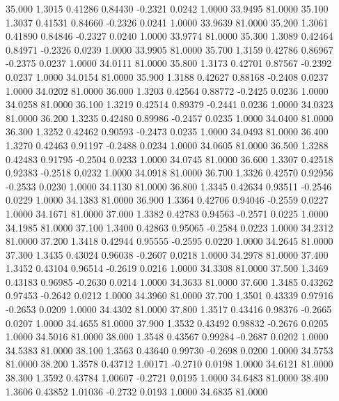   35.000   1.3015   0.41286   0.84430  -0.2321   0.0242   1.0000  33.9495  81.0000
  35.100   1.3037   0.41531   0.84660  -0.2326   0.0241   1.0000  33.9639  81.0000
  35.200   1.3061   0.41890   0.84846  -0.2327   0.0240   1.0000  33.9774  81.0000
  35.300   1.3089   0.42464   0.84971  -0.2326   0.0239   1.0000  33.9905  81.0000
  35.700   1.3159   0.42786   0.86967  -0.2375   0.0237   1.0000  34.0111  81.0000
  35.800   1.3173   0.42701   0.87567  -0.2392   0.0237   1.0000  34.0154  81.0000
  35.900   1.3188   0.42627   0.88168  -0.2408   0.0237   1.0000  34.0202  81.0000
  36.000   1.3203   0.42564   0.88772  -0.2425   0.0236   1.0000  34.0258  81.0000
  36.100   1.3219   0.42514   0.89379  -0.2441   0.0236   1.0000  34.0323  81.0000
  36.200   1.3235   0.42480   0.89986  -0.2457   0.0235   1.0000  34.0400  81.0000
  36.300   1.3252   0.42462   0.90593  -0.2473   0.0235   1.0000  34.0493  81.0000
  36.400   1.3270   0.42463   0.91197  -0.2488   0.0234   1.0000  34.0605  81.0000
  36.500   1.3288   0.42483   0.91795  -0.2504   0.0233   1.0000  34.0745  81.0000
  36.600   1.3307   0.42518   0.92383  -0.2518   0.0232   1.0000  34.0918  81.0000
  36.700   1.3326   0.42570   0.92956  -0.2533   0.0230   1.0000  34.1130  81.0000
  36.800   1.3345   0.42634   0.93511  -0.2546   0.0229   1.0000  34.1383  81.0000
  36.900   1.3364   0.42706   0.94046  -0.2559   0.0227   1.0000  34.1671  81.0000
  37.000   1.3382   0.42783   0.94563  -0.2571   0.0225   1.0000  34.1985  81.0000
  37.100   1.3400   0.42863   0.95065  -0.2584   0.0223   1.0000  34.2312  81.0000
  37.200   1.3418   0.42944   0.95555  -0.2595   0.0220   1.0000  34.2645  81.0000
  37.300   1.3435   0.43024   0.96038  -0.2607   0.0218   1.0000  34.2978  81.0000
  37.400   1.3452   0.43104   0.96514  -0.2619   0.0216   1.0000  34.3308  81.0000
  37.500   1.3469   0.43183   0.96985  -0.2630   0.0214   1.0000  34.3633  81.0000
  37.600   1.3485   0.43262   0.97453  -0.2642   0.0212   1.0000  34.3960  81.0000
  37.700   1.3501   0.43339   0.97916  -0.2653   0.0209   1.0000  34.4302  81.0000
  37.800   1.3517   0.43416   0.98376  -0.2665   0.0207   1.0000  34.4655  81.0000
  37.900   1.3532   0.43492   0.98832  -0.2676   0.0205   1.0000  34.5016  81.0000
  38.000   1.3548   0.43567   0.99284  -0.2687   0.0202   1.0000  34.5383  81.0000
  38.100   1.3563   0.43640   0.99730  -0.2698   0.0200   1.0000  34.5753  81.0000
  38.200   1.3578   0.43712   1.00171  -0.2710   0.0198   1.0000  34.6121  81.0000
  38.300   1.3592   0.43784   1.00607  -0.2721   0.0195   1.0000  34.6483  81.0000
  38.400   1.3606   0.43852   1.01036  -0.2732   0.0193   1.0000  34.6835  81.0000
